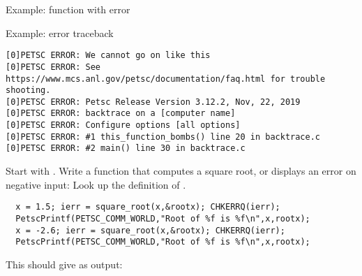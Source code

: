 \lstset{language=C}
\begin{details}


\begin{frame}[containsverbatim]{Example: function with error}
\end{frame}

\begin{frame}[containsverbatim]{Example: error traceback}
\footnotesize
\begin{verbatim}
[0]PETSC ERROR: We cannot go on like this
[0]PETSC ERROR: See https://www.mcs.anl.gov/petsc/documentation/faq.html for trouble shooting.
[0]PETSC ERROR: Petsc Release Version 3.12.2, Nov, 22, 2019
[0]PETSC ERROR: backtrace on a [computer name]
[0]PETSC ERROR: Configure options [all options]
[0]PETSC ERROR: #1 this_function_bombs() line 20 in backtrace.c
[0]PETSC ERROR: #2 main() line 30 in backtrace.c
\end{verbatim}
\end{frame}

\begin{exerciseframe}[root]
Start with . Write a function that computes a square root,
or displays an error on negative input:
Look up the definition of .
\begin{lstlisting}
  x = 1.5; ierr = square_root(x,&rootx); CHKERRQ(ierr);
  PetscPrintf(PETSC_COMM_WORLD,"Root of %f is %f\n",x,rootx);
  x = -2.6; ierr = square_root(x,&rootx); CHKERRQ(ierr);
  PetscPrintf(PETSC_COMM_WORLD,"Root of %f is %f\n",x,rootx);
\end{lstlisting}
This should give as output:


\end{exerciseframe}
\end{details}
